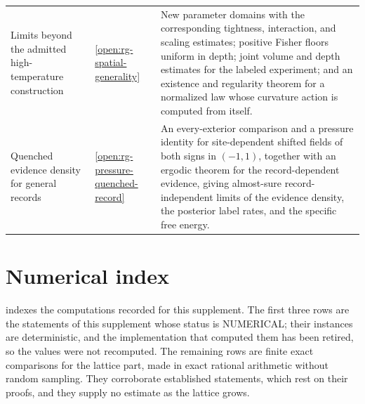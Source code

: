 {\begin{longtable}{@{}>{\raggedright\arraybackslash}p{}
>{\raggedright\arraybackslash}p{}
>{\raggedright\arraybackslash}p{}@{}}
Limits beyond the admitted high-temperature construction & \cref{open:rg-spatial-generality} & New parameter domains with the corresponding tightness, interaction, and scaling estimates; positive Fisher floors uniform in depth; joint volume and depth estimates for the labeled experiment; and an existence and regularity theorem for a normalized law whose curvature action is computed from itself. \\
Quenched evidence density for general records & \cref{open:rg-pressure-quenched-record} & An every-exterior comparison and a pressure identity for site-dependent shifted fields of both signs in $(-1,1)$, together with an ergodic theorem for the record-dependent evidence, giving almost-sure record-independent limits of the evidence density, the posterior label rates, and the specific free energy. \\
\end{longtable}
}

\section{Numerical index}
\label{sec:rg-thermo-numerical-provenance}

 indexes the computations recorded for this supplement. The first three rows
are the statements of this supplement whose status is NUMERICAL; their instances are deterministic,
and the implementation that computed them has been retired, so the values were not recomputed. The
remaining rows are finite exact comparisons for the lattice part, made in exact
rational arithmetic without random sampling. They corroborate established statements, which rest on
their proofs, and they supply no estimate as the lattice grows.

